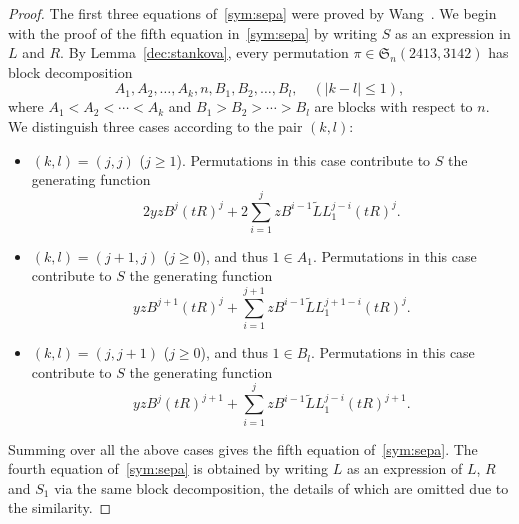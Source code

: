 \documentclass[12pt]{amsart}
\numberwithin{equation}{section}
\theoremstyle{plain}
\theoremstyle{definition}
\def\S{\mathfrak{S}}
\begin{document}
\begin{proof}
The first three equations of~\eqref{sym:sepa}  were proved by Wang~\cite{wan}. We begin with the proof of the fifth  equation in~\eqref{sym:sepa} by writing $S$ as an expression in $L$ and $R$. By Lemma~\ref{dec:stankova}, every  permutation $\pi\in\S_n(2413,3142)$  has block decomposition
$$
A_1, A_2, \ldots, A_k,n, B_1, B_2,\ldots, B_l,\quad (|k-l|\leq1),
$$
 where $A_1<A_2<\cdots<A_k$ and $B_1>B_2>\cdots >B_l$ are blocks with respect to $n$. 
 We distinguish three cases according to the pair $(k,l)$:
 \begin{itemize}
 \item[1)] $(k,l)=(j,j)$ ($j\geq1$). Permutations in this case contribute to $S$ the generating function 
 $$
 2yzB^j(tR)^j+2\sum_{i=1}^jzB^{i-1}\tilde L L_1^{j-i}(tR)^j.
 $$

 \item[2)] $(k,l)=(j+1,j)$ ($j\geq0$), and thus $1\in A_1$. Permutations in this case contribute to $S$ the generating function 
 $$
 yzB^{j+1}(tR)^j+\sum_{i=1}^{j+1}zB^{i-1}\tilde L L_1^{j+1-i}(tR)^j.
 $$

 \item[3)] $(k,l)=(j,j+1)$ ($j\geq0$), and thus $1\in B_l$.
 Permutations in this case contribute to $S$ the generating function 
 $$
 yzB^{j}(tR)^{j+1}+\sum_{i=1}^{j}zB^{i-1}\tilde L L_1^{j-i}(tR)^{j+1}.
 $$
 \end{itemize}


 Summing over all the above cases gives the fifth equation of~\eqref{sym:sepa}. The fourth equation of~\eqref{sym:sepa} is obtained by writing $L$ as an expression of $L$, $R$ and $S_1$ via the same block decomposition, the details of which are omitted due to the similarity. 
\end{proof}
\end{document}
